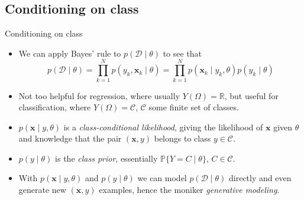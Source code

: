 \documentclass{beamer}
\numberwithin{equation}{section}
\begin{document}
\subsection{Conditioning on class}

\begin{frame}{Conditioning on class}
    \begin{itemize}
        \item
        We can apply Bayes' rule to $ p(\mathcal{D} \mid \theta) $ to see that
        \begin{equation*}
            p(\mathcal{D} \mid \theta) =
            \prod_{k = 1}^Np(y_k, \mathbf{x}_k \mid \theta) =
            \prod_{k = 1}^Np(\mathbf{x}_k \mid y_k, \theta)p(y_k \mid \theta)
        \end{equation*}

        \item
        Not too helpful for regression, where usually
        $ Y(\Omega) = \mathbb{R} $, but useful for classification, where
        $ Y(\Omega) = \mathcal{C} $, $ \mathcal{C} $ some finite set of
        classes.

        \item
        $ p(\mathbf{x} \mid y, \theta) $ is a \textit{class-conditional
        likelihood}, giving the likelihood of $ \mathbf{x} $ given $ \theta $
        and knowledge that the pair $ (\mathbf{x}, y) $ belongs to class
        $ y \in \mathcal{C} $.

        \item
        $ p(y \mid \theta) $ is the \textit{class prior}, essentially
        $ \mathbb{P}\{Y = C \mid \theta\} $, $ C \in \mathcal{C} $.

        \item
        With $ p(\mathbf{x} \mid y, \theta) $ and $ p(y \mid \theta) $
        we can model $ p(\mathcal{D} \mid \theta) $ directly and even generate
        new $ (\mathbf{x}, y) $ examples, hence the moniker
        \textit{generative modeling}.
    \end{itemize}
\end{frame}
\end{document}
